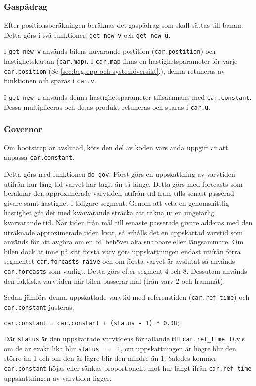 \subsubsection{Gaspådrag}

Efter positionsberäkningen beräknas det gaspådrag som skall sättas till banan. Detta görs i två
funktioner, \texttt{get\_new\_v} och \texttt{get\_new\_u}.
 
I \texttt{get\_new\_v} används bilens nuvarande postition (\texttt{car.postition})
och hastighetskartan (\texttt{car.map}). I \texttt{car.map} finns en
hastighetsparameter för varje \texttt{car.position} (Se \ref{sec:begrepp och systemöversikt}.), denna retuneras av funktionen
och sparas i \texttt{car.v}.
 
I \texttt{get\_new\_u} används denna hastighetsparameter tillsammans med
\texttt{car.constant}. Dessa multipliceras och deras produkt retuneras och sparas
i \texttt{car.u}.

\subsubsection{Governor}
\label{sec:systembeskrivning:governor}
Om bootstrap är avslutad, körs den del av koden vars ända uppgift är att 
anpassa \texttt{car.constant}. 

Detta görs med funktionen \texttt{do\_gov}.  Först görs en uppskattning av 
varvtiden utifrån hur lång tid varvet har tagit än
så länge. Detta görs med forecasts som beräknar den approximerade varvtiden utifrån tid fram tills senast
passerad givare samt hastighet i tidigare segment. Genom att veta en
genomsnittlig hastighet går det med kvarvarande sträcka att räkna ut en
ungefärlig kvarvarande tid. När tiden från mål till senaste passerade givare adderas med
den uträknade approximerade tiden kvar, så erhålls det en uppskattad varvtid som
används för att avgöra om en bil behöver åka snabbare eller långsammare. Om bilen dock är inne på sitt första varv görs uppskattningen endast
utifrån förra segmentet \texttt{car.forcasts\_naive} och om första varvet är
avslutat så används \texttt{car.forcasts} som vanligt. Detta görs efter segment 4 och 8. Dessutom används den
faktiska varvtiden när bilen passerar mål (från varv 2 och frammåt).
 
Sedan jämförs denna uppskattade varvtid med referenstiden (\texttt{car.ref\_time}) 
och \texttt{car.constant} justeras.
\begin{verbatim}
car.constant = car.constant + (status - 1) * 0.08;
\end{verbatim}
Där \texttt{status} är den uppskattade varvtidens förhållande till \texttt{car.ref\_time}.
D.v.s om de är exakt lika blir \texttt{status~ =~ 1}, om uppskattningen är högre blir
den större än 1 och om den är lägre blir den mindre än 1. Således kommer \texttt{car.constant}
höjas eller sänkas proportionellt mot hur långt ifrån \texttt{car.ref\_time} uppskattningen
av varvtiden ligger. 

